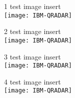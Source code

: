 
1 test image insert\\

\texttt{[image: IBM-QRADAR]}


2 test image insert\\

\texttt{[image: IBM-QRADAR]}


3 test image insert\\

\texttt{[image: IBM-QRADAR]}


4 test image insert\\

\texttt{[image: IBM-QRADAR]}